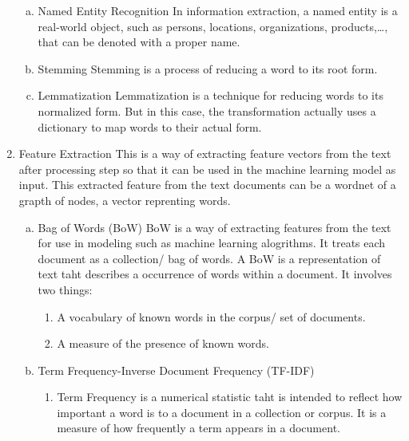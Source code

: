 \documentclass[12pt]{article}
\begin{document}
\begin{enumerate}
\begin{enumerate}[a.]
            \item Named Entity Recognition
            \newline In information extraction, a named entity is a real-world object, 
            such as persons, locations, organizations, products,\dots, that can be denoted with a proper name. 
            
            \item Stemming
            \newline Stemming is a process of reducing a word to its root form.

            \item Lemmatization
            \newline Lemmatization is a technique for reducing words to its normalized form. But in this case, 
            the transformation actually uses a dictionary to map words to their actual form.

        \end{enumerate}
        

        \item Feature Extraction
        \newline This is a way of extracting feature vectors from the text after processing step 
        so that it can be used in the machine learning model as input. This extracted feature from the text documents 
        can be a wordnet of a grapth of nodes, a vector reprenting words.

        \begin{enumerate}[a.]

            \item Bag of Words (BoW)
            \newline BoW is a way of extracting features from the text for use in modeling such as machine learning alogrithms. 
            It treats each document as a collection/ bag of words.
            \newline A BoW is a representation of text taht describes a occurrence of words within a document. It involves two things:
            \begin{enumerate}
                \item[\textbullet] A vocabulary of known words in the corpus/ set of documents.
                \item[\textbullet] A measure of the presence of known words.
            \end{enumerate}
    
            \item Term Frequency-Inverse Document Frequency (TF-IDF)
            \begin{enumerate}
                \item[\textbullet] Term Frequency is a numerical statistic taht is intended to reflect how 
                important a word is to a document in a collection or corpus.
                It is a measure of how frequently a term appears in a document.
                

\end{enumerate}
\end{enumerate}
\end{enumerate}
\end{document}
